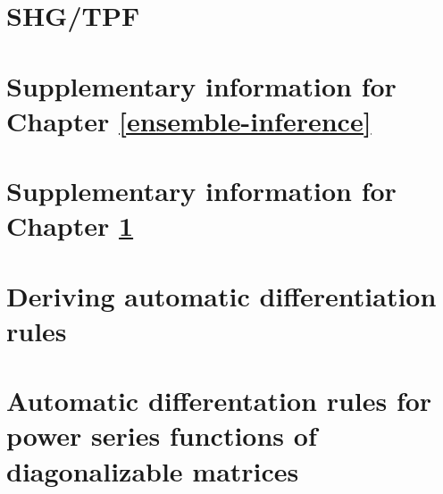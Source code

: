 \documentclass[12pt,twoside]{report}
\begin{document}
\chapter{SHG/TPF}
\label{shg-tpf}


\appendix

\chapter{Supplementary information for Chapter \ref{ensemble-inference}}


\chapter{Supplementary information for Chapter \ref{shg-tpf}}


\chapter{Deriving automatic differentiation rules}


\chapter{Automatic differentation rules for power series functions of diagonalizable matrices}

\end{document}
